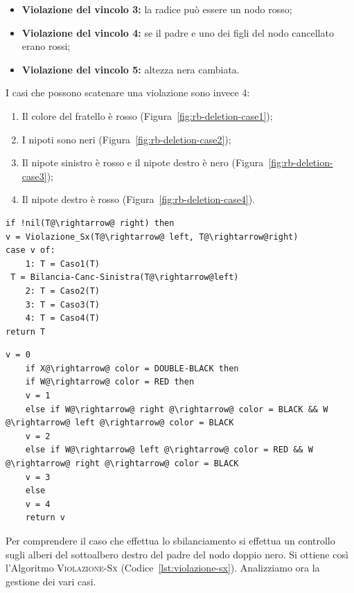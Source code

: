\begin{itemize}
\item \textbf{Violazione del vincolo 3:} la radice può essere un nodo rosso;
\item \textbf{Violazione del vincolo 4:} se il padre e uno dei figli del nodo cancellato erano rossi;
\item \textbf{Violazione del vincolo 5:} altezza nera cambiata.
\end{itemize}

I casi che possono scatenare una violazione sono invece 4:
\begin{enumerate}
\item Il colore del fratello è rosso (Figura~\ref{fig:rb-deletion-case1});
\item I nipoti sono neri (Figura~\ref{fig:rb-deletion-case2});
\item Il nipote sinistro è rosso e il nipote destro è nero (Figura~\ref{fig:rb-deletion-case3});
\item Il nipote destro è rosso (Figura~\ref{fig:rb-deletion-case4}).
\end{enumerate}

\begin{lstlisting}[language=asd,caption={\textsc{Bilancia-Canc-Sinistra-RB}(T)},label=lst:bilancia-sx-rb-del]
if !nil(T@\rightarrow@ right) then
v = Violazione_Sx(T@\rightarrow@ left, T@\rightarrow@right)
case v of:
	1: T = Caso1(T)
 T = Bilancia-Canc-Sinistra(T@\rightarrow@left)
	2: T = Caso2(T)
	3: T = Caso3(T)
	4: T = Caso4(T)
return T
\end{lstlisting}

\begin{lstlisting}[language=asd,caption={\textsc{Violazione\_Sx}(X,W)},label=lst:violazione-sx]
	v = 0
	if X@\rightarrow@ color = DOUBLE-BLACK then
	if W@\rightarrow@ color = RED then
	v = 1
	else if W@\rightarrow@ right @\rightarrow@ color = BLACK && W @\rightarrow@ left @\rightarrow@ color = BLACK
	v = 2
	else if W@\rightarrow@ left @\rightarrow@ color = RED && W @\rightarrow@ right @\rightarrow@ color = BLACK
	v = 3
	else
	v = 4
	return v
\end{lstlisting}


Per comprendere il caso che effettua lo sbilanciamento si effettua un controllo sugli alberi del sottoalbero destro del padre del nodo doppio nero. Si ottiene così l'Algoritmo \textsc{Violazione-Sx} (Codice~\ref{lst:violazione-sx}). Analizziamo ora la gestione dei vari casi.

